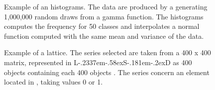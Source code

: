 \documentclass [11pt,a4paper] {book}
\def\LsD{{L\kern-.2337em\lower-.58ex\hbox{S}\kern-.181em\lower-.2ex\hbox{D}}\xspace}
\begin{document}
\begin{figure}[ht]
  \centering
  \caption{\small Example of an histograms. The data are produced by a generating 1,000,000 random draws from a gamma function. The histograms computes the frequency for 50 classes and interpolates a normal function computed with the same mean and variance of the data.}
  \label{fig:ex_histo}
\end{figure}

\begin{figure}[ht]
  \centering
  \caption{\small Example of a lattice. The series selected are taken from a 400 x 400 matrix, represented in \LsD as 400 objects  containing each 400 objects . The series concern an element located in , taking values 0 or 1.} 
  \label{fig:ex_lattice}
\end{figure}
\end{document}
